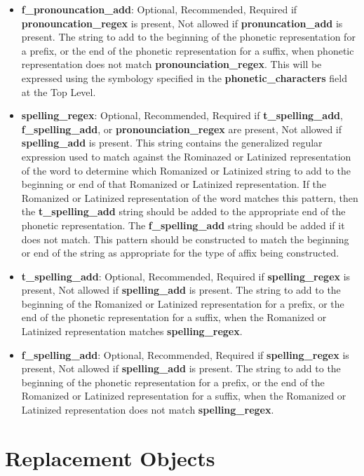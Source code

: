\begin{itemize}
	\item \textbf{f\_pronouncation\_add}: Optional, Recommended, Required if \textbf{pronouncation\_regex} is present, Not allowed if \textbf{pronuncation\_add} is present.  The string to add to the beginning of the phonetic representation for a prefix, or the end of the phonetic representation for a suffix, when phonetic representation does not match \textbf{pronounciation\_regex}.  This will be expressed using the symbology specified in the \textbf{phonetic\_characters} field at the Top Level.
	\item \textbf{spelling\_regex}: Optional, Recommended, Required if \textbf{t\_spelling\_add}, \textbf{f\_spelling\_add}, or \textbf{pronounciation\_regex} are present, Not allowed if \textbf{spelling\_add} is present.  This string contains the generalized regular expression used to match against the Rominazed or Latinized representation of the word to determine which Romanized or Latinized string to add to the beginning or end of that Romanized or Latinized representation.  If the Romanized or Latinized representation of the word matches this pattern, then the \textbf{t\_spelling\_add} string should be added to the appropriate end of the phonetic representation.  The \textbf{f\_spelling\_add} string should be added if it does not match.  This pattern should be constructed to match the beginning or end of the string as appropriate for the type of affix being constructed.
	\item \textbf{t\_spelling\_add}: Optional, Recommended, Required if \textbf{spelling\_regex} is present, Not allowed if \textbf{spelling\_add} is present.  The string to add to the beginning of the Romanized or Latinized representation for a prefix, or the end of the phonetic representation for a suffix, when the Romanized or Latinized representation matches \textbf{spelling\_regex}.
	\item \textbf{f\_spelling\_add}: Optional, Recommended, Required if \textbf{spelling\_regex} is present, Not allowed if \textbf{spelling\_add} is present.  The string to add to the beginning of the phonetic representation for a prefix, or the end of the Romanized or Latinized representation for a suffix, when the Romanized or Latinized representation does not match \textbf{spelling\_regex}.
\end{itemize}

\section{Replacement Objects}

